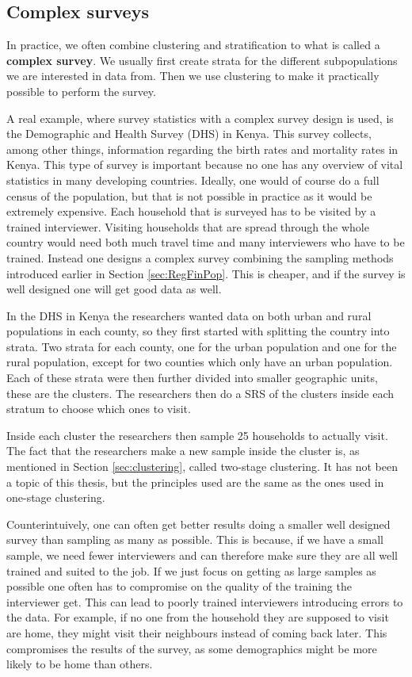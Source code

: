 \documentclass{article}
\begin{document}
\subsection{Complex surveys} \label{sec:complexSurveys}

In practice, we often combine clustering and stratification to what is called a
\textbf{complex survey}. We usually first create strata for the different subpopulations
we are interested in data from. Then we use clustering to make it
practically possible to perform the survey.

A real example, where survey statistics with a complex survey design is used, is the Demographic and Health
Survey (DHS) in Kenya. This survey collects, among other things, 
information regarding the birth rates and mortality rates in Kenya. This type of
survey is important because no one has any overview of vital statistics in
many developing countries.
Ideally, one would of course do a full census of the population, but that is not
possible in practice as it would be extremely expensive. Each household that is
surveyed has to be visited by a trained interviewer. Visiting
households that are spread through the whole country would need both much travel time and
many interviewers who have to be trained. Instead one designs a
complex survey combining the sampling methods introduced earlier in Section
\ref{sec:RegFinPop}. This is cheaper, and if the survey is well designed
one will get good data as well.

In the DHS in Kenya the researchers wanted data on both urban and rural
populations in each county, so they first started with splitting the country into
strata. Two strata for each county, one for the urban population and one for the
rural population, except for two counties which only have an urban population.
Each of these strata were then further divided into smaller geographic units,
these are the clusters. The researchers then do a SRS of the clusters inside
each stratum to choose which ones to visit. \cite{DHS}

Inside each cluster the researchers then sample 25 households to actually
visit. The fact that the researchers make a new sample inside the cluster is, as
mentioned in Section \ref{sec:clustering},
called two-stage clustering. It has not been a topic of this thesis, but the
principles used are the same as the ones used in one-stage clustering. \cite{DHS}

Counterintuively, one can often get better results doing a smaller well designed
survey than sampling as many as possible. This is because, if we have a small
sample, we need fewer interviewers and can therefore make sure
they are all well trained and suited to the job. If we just focus on getting as
large samples as possible one often has to compromise on the quality of the
training the interviewer get. This can lead to poorly trained interviewers introducing errors
to the data. For example, if no one from the household they are supposed to visit are
home, they might visit their neighbours instead of coming back later. This compromises the results of
the survey, as some demographics might be more likely to be home than others.
\end{document}
